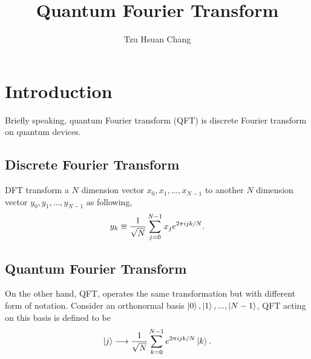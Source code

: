 \documentclass[a4paper]{article}
\title{Quantum Fourier Transform}
\author{Tzu Hsuan Chang}
\begin{document}
\maketitle

\section{Introduction}
\label{sec:Intro}
Briefly speaking, quantum Fourier transform (QFT) is discrete Fourier transform on quantum devices.


\subsection*{Discrete Fourier Transform}
\label{subsec:dft}
DFT transform a $N$ dimension vector $x_0, x_1, ... ,x_{N-1}$ to another $N$ dimension vector $y_0, y_1, ... ,y_{N-1}$ as following,
    \begin{equation} \label{eq:eq1}
    \setlength{\jot}{10pt}
    \begin{aligned}
        \large y_k \equiv \frac{1}{\sqrt{N}} \sum_{j=0}^{N-1} x_j e^{2\pi ijk / N}.
    \end{aligned}
    \end{equation}


\subsection*{Quantum Fourier Transform}
\label{subsec:qft}
On the other hand, QFT, operates the same transformation but with different form of notation. Consider an orthonormal basis $\ket{0}, \ket{1}, ... ,\ket{N-1}$, QFT acting on this basis is defined to be
    \begin{equation} \label{eq:eq2}
    \setlength{\jot}{10pt}
    \begin{aligned}
        \ket{j} \longrightarrow \frac{1}{\sqrt{N}} \sum_{k=0}^{N-1} e^{2 \pi i j k / N} \ket{k}.
    \end{aligned}
    \end{equation}
    
\end{document}
